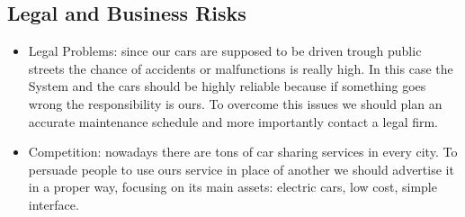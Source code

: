 \subsection{Legal and Business Risks}
\begin{itemize}
\item Legal Problems: since our cars are supposed to be driven trough public streets the chance of accidents or malfunctions is really high. In this case the System and the cars should be highly reliable because if something goes wrong the responsibility is ours. To overcome this issues we should plan an accurate maintenance schedule and more importantly contact a legal firm.
\item Competition: nowadays there are tons of car sharing services in every city. To persuade people to use ours service in place of another we should advertise it in a proper way, focusing on its main assets: electric cars, low cost, simple interface. 
\end{itemize}